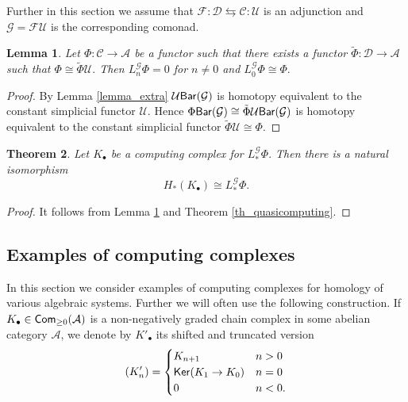 \documentclass{amsart}
\numberwithin{equation}{section}
\newtheorem{theorem}{Theorem}[section]
\newtheorem{lemma}[theorem]{Lemma}
\theoremstyle{definition}
\def\CC{\mathcal{C}}
\def\FF{\mathcal{F}}
\def\GG{\mathcal{G}}
\def\UU{\mathcal{U}}
\def\DD{\mathcal{D}}
\def\AA{\mathcal{A}}
\begin{document}
Further in this section we assume that $\FF:\DD\leftrightarrows \CC: \UU$ is an adjunction and $\GG=\FF\UU$ is the corresponding comonad. 

\begin{lemma}\label{lemma_computing}
Let $\Phi:\CC\to \AA$ be a functor such that there exists a functor $\tilde \Phi:\DD\to \AA$ such that $\Phi\cong \tilde{\Phi}\UU.$ Then $L_n^\GG\Phi =0$ for $n\ne 0$ and $L^\GG_0\Phi \cong \Phi.$
\end{lemma}
\begin{proof} By Lemma \ref{lemma_extra} $\UU{\sf Bar}(\GG)$ is homotopy equivalent to the constant simplicial functor $\UU.$ Hence $ \Phi {\sf Bar}(\GG)\cong \tilde{\Phi} \UU{\sf Bar}(\GG)$ is homotopy equivalent to the constant simplicial functor $\tilde \Phi \UU\cong \Phi.$
\end{proof}

\begin{theorem}\label{th_computing}
Let $K_\bullet$ be a computing complex for  $L^\GG_*\Phi.$ Then there is a natural isomorphism 
$$H_*(K_\bullet)\cong L^\GG_*\Phi.$$
\end{theorem}
\begin{proof}
It follows from Lemma \ref{lemma_computing} and Theorem \ref{th_quasicomputing}.
\end{proof}

\subsection{Examples of computing complexes}

In this section we consider examples of computing complexes for homology of various algebraic systems. Further we will often use the following construction. If $K_\bullet\in {\sf Com}_{\geq 0}(\AA)$ is a non-negatively graded chain complex in some abelian category $\AA$, we denote by $K'_\bullet$ its shifted and truncated version  
\begin{equation}\label{eq_K'}
(K_n')=
\begin{cases}
K_{n+1} & n> 0\\
{\sf Ker}(K_1\to K_0) & n=0\\
0 & n<0.
\end{cases}
\end{equation}
\end{document}
